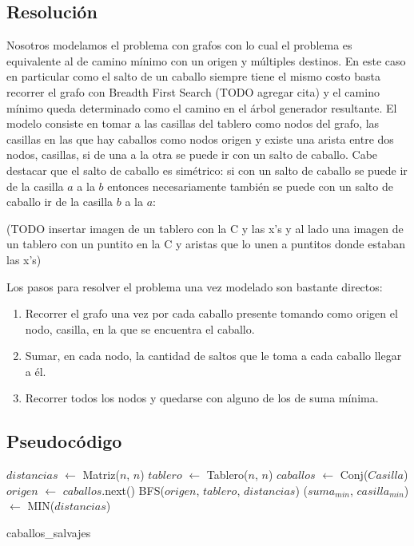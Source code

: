 \subsection{Resolución}
Nosotros modelamos el problema con grafos con lo cual el problema es equivalente al de camino mínimo 
con un origen y múltiples destinos. En este caso en particular como el salto de un caballo siempre 
tiene el mismo costo basta recorrer el grafo con Breadth First Search (TODO agregar cita) y el camino mínimo queda 
determinado como el camino en el árbol generador resultante.
El modelo consiste en tomar a las casillas del tablero como nodos del grafo, las casillas en las que 
hay caballos como nodos origen y existe una arista entre dos nodos, casillas, si de una a la otra se
puede ir con un salto de caballo. Cabe destacar que el salto de caballo es simétrico: si con un salto
de caballo se puede ir de la casilla $a$ a la $b$ entonces necesariamente también se puede con un 
salto de caballo ir de la casilla $b$ a la $a$:\\
\begin{center}
(TODO insertar imagen de un tablero con la C y las x's y al lado una imagen de un tablero con un puntito en
la C y aristas que lo unen a puntitos donde estaban las x's)
\end{center}
Los pasos para resolver el problema una vez modelado son bastante directos:
\begin{enumerate}
  \item Recorrer el grafo una vez por cada caballo presente tomando como origen el nodo, casilla, en la 
    que se encuentra el caballo.
  \item Sumar, en cada nodo, la cantidad de saltos que le toma a cada caballo llegar a él.
  \item Recorrer todos los nodos y quedarse con alguno de los de suma mínima.
\end{enumerate}

\subsection{Pseudocódigo}
\begin{algorithm}[H]
  \begin{algorithmic}
    \STATE $distancias$ $\gets$ Matriz($n$, $n$)
    \STATE $tablero$ $\gets$ Tablero($n$, $n$)
    \STATE $caballos$ $\gets$ Conj($Casilla$)
      \STATE $origen$ $\gets$ $caballos$.next()
      \STATE BFS($origen$, $tablero$, $distancias$)
    \ENDWHILE
    \STATE ($suma_{min}$, $casilla_{min}$) $\gets$ MIN($distancias$)
    \caption{caballos\_salvajes}
  \end{algorithmic}
\end{algorithm}


